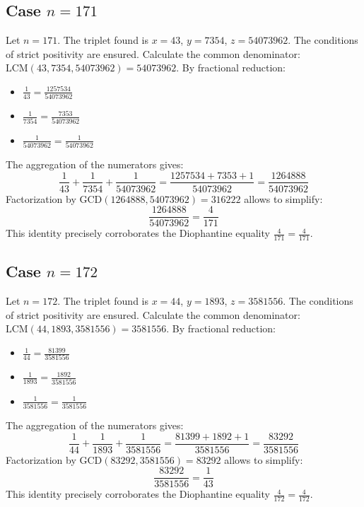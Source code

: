 \documentclass[11pt,a4paper]{article}
\begin{document}
\subsection{Case $n = 171$}
Let $n = 171$. The triplet found is $x = 43$, $y = 7354$, $z = 54073962$.
The conditions of strict positivity are ensured.
Calculate the common denominator: $\text{LCM}(43, 7354, 54073962) = 54073962$.
By fractional reduction:
\begin{itemize}
    \item $\frac{1}{43} = \frac{1257534}{54073962}$
    \item $\frac{1}{7354} = \frac{7353}{54073962}$
    \item $\frac{1}{54073962} = \frac{1}{54073962}$
\end{itemize}
The aggregation of the numerators gives:
$$ \frac{1}{43} + \frac{1}{7354} + \frac{1}{54073962} = \frac{1257534 + 7353 + 1}{54073962} = \frac{1264888}{54073962} $$
Factorization by $\text{GCD}(1264888, 54073962) = 316222$ allows to simplify:
$$ \frac{1264888}{54073962} = \frac{4}{171} $$
This identity precisely corroborates the Diophantine equality $\frac{4}{171} = \frac{4}{171}$.

\subsection{Case $n = 172$}
Let $n = 172$. The triplet found is $x = 44$, $y = 1893$, $z = 3581556$.
The conditions of strict positivity are ensured.
Calculate the common denominator: $\text{LCM}(44, 1893, 3581556) = 3581556$.
By fractional reduction:
\begin{itemize}
    \item $\frac{1}{44} = \frac{81399}{3581556}$
    \item $\frac{1}{1893} = \frac{1892}{3581556}$
    \item $\frac{1}{3581556} = \frac{1}{3581556}$
\end{itemize}
The aggregation of the numerators gives:
$$ \frac{1}{44} + \frac{1}{1893} + \frac{1}{3581556} = \frac{81399 + 1892 + 1}{3581556} = \frac{83292}{3581556} $$
Factorization by $\text{GCD}(83292, 3581556) = 83292$ allows to simplify:
$$ \frac{83292}{3581556} = \frac{1}{43} $$
This identity precisely corroborates the Diophantine equality $\frac{4}{172} = \frac{4}{172}$.
\end{document}

